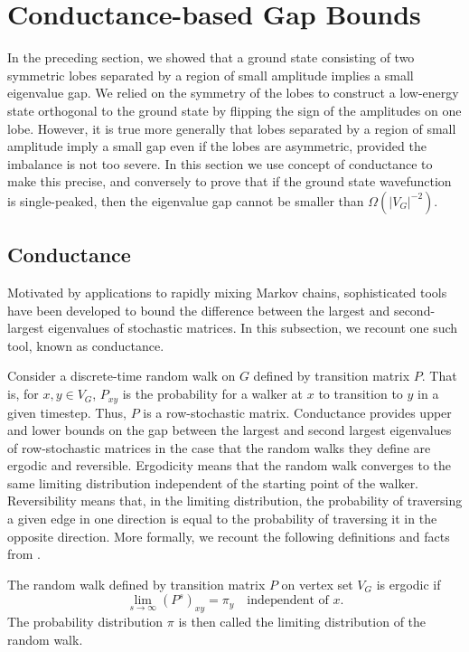 \section{Conductance-based Gap Bounds}
\label{sec:conductance}
In the preceding section, we showed that a ground state consisting of
two symmetric lobes separated by a region of small amplitude implies a
small eigenvalue gap. We relied on the symmetry of the lobes to
construct a low-energy state orthogonal to the ground state by
flipping the sign of the amplitudes on one lobe. However, it is true
more generally that lobes separated by a region of small amplitude
imply a small gap even if the lobes are asymmetric, provided the
imbalance is not too severe. In this section we use concept of
conductance to make this precise, and conversely to prove that if the
ground state wavefunction is single-peaked, then the eigenvalue gap
cannot be smaller than $\Omega(|V_G|^{-2})$.

\subsection{Conductance}
\label{subsec:conductance}

Motivated by applications to rapidly mixing Markov chains,
sophisticated tools have been developed to bound the difference
between the largest and second-largest eigenvalues of stochastic 
matrices. In this subsection, we recount one such tool, known as
conductance.

Consider a discrete-time random walk on $G$ defined by transition
matrix $P$. That is, for $x,y \in V_G$, $P_{xy}$ is the
probability for a walker at $x$ to transition to $y$ in
a given timestep. Thus, $P$ is a row-stochastic matrix. Conductance
provides upper and lower bounds on the gap between the largest and
second largest eigenvalues of row-stochastic matrices in the case that
the random walks they define are ergodic and reversible. Ergodicity means
that the random walk converges to the same limiting distribution
independent of the starting point of the walker. Reversibility means
that, in the limiting distribution, the probability of traversing a
given edge in one direction is equal to the probability of traversing
it in the opposite direction. More formally, we recount the following
definitions and facts from \cite{Sinclair}.

\begin{definition}
The random walk defined by transition matrix $P$ on vertex set $V_G$
is ergodic if
\begin{equation}
\lim_{s \to \infty} \left( P^s \right)_{xy} = \pi_y \quad
\textrm{independent of $x$}.
\end{equation}
The probability distribution $\pi$ is then called the limiting
distribution of the random walk.
\end{definition}


